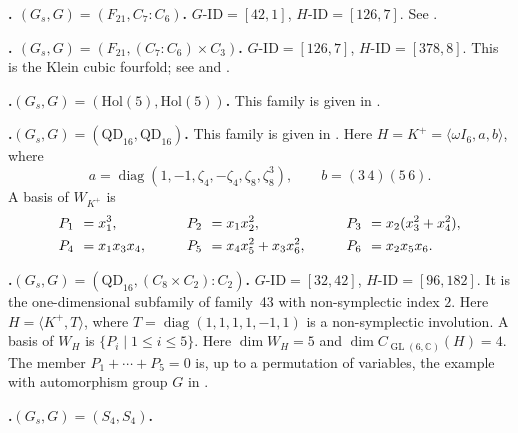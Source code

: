 \documentclass[12pt]{amsart}
\numberwithin{equation}{section}
\theoremstyle{plain}
\theoremstyle{definition}
\theoremstyle{remark}
\newcommand{\CC}{\mathbb C}
\DeclareMathOperator{\GL}{GL}
\DeclareMathOperator{\diag}{diag}
\newcommand{\PBasisLabel}[1]{\mathrlap{P_{#1}}\phantom{P_{99}}}
\begin{document}
\par{}\medskip\noindent\textbf{.\enspace
$(G_s,G)=(F_{21},C_7:C_6)$.}\label{fam:fourfold-no-40}
$G\text{-ID}=[42,1]$, $H\text{-ID}=[126,7]$.
See
\cite[Theorem~1.2(2), \S4.1]{he2025cubicfourfoldsorder7automorphism}.

\par{}\medskip\noindent\textbf{.\enspace
$(G_s,G)=(F_{21},(C_7:C_6)\times C_3)$.}\label{fam:fourfold-no-41}
$G\text{-ID}=[126,7]$, $H\text{-ID}=[378,8]$.
This is the Klein cubic fourfold; see
\cite[\S6.1, (9)]{yang2024automorphism} and
\cite[Theorem~1.2(3), \S4.1]{he2025cubicfourfoldsorder7automorphism}.

\par{}\medskip\noindent\textbf{.\enspace $(G_s,G)=(\mathrm{Hol}(5),\mathrm{Hol}(5))$.}\label{fam:fourfold-no-42}
This family is given in \cite[(6.15)]{KOIKE202512}.

\par{}\medskip\noindent\textbf{.\enspace $(G_s,G)=(\mathrm{QD}_{16},\mathrm{QD}_{16})$.}\label{fam:fourfold-no-43}
This family is given in \cite[(6.3)]{KOIKE202512}.
Here $H=K^+=\langle\omega I_6,a,b\rangle$, where
\[
a=\diag(1,-1,\zeta_4,-\zeta_4,\zeta_8,\zeta_8^3),
\qquad b=(3\,4)(5\,6).
\]
A basis of $W_{K^+}$ is
\begin{alignat*}{3}
\PBasisLabel{1}&=x_1^3,\qquad &\PBasisLabel{2}&=x_1x_2^2,\qquad &\PBasisLabel{3}&=x_2(x_3^2+x_4^2),\\
\PBasisLabel{4}&=x_1x_3x_4,\qquad &\PBasisLabel{5}&=x_4x_5^2+x_3x_6^2,\qquad &\PBasisLabel{6}&=x_2x_5x_6.
\end{alignat*}

\par{}\medskip\noindent\textbf{.\enspace $(G_s,G)=(\mathrm{QD}_{16},(C_8\times C_2):C_2)$.}\label{fam:fourfold-no-44}
$G\text{-ID}=[32,42]$, $H\text{-ID}=[96,182]$.
It is the one-dimensional subfamily of family~43 with non-symplectic
index $2$.  Here $H=\langle K^+,T\rangle$, where
$T=\diag(1,1,1,1,-1,1)$ is a non-symplectic involution.  A basis of $W_H$ is
$\{P_i\mid 1\le i\le5\}$.
Here $\dim W_H=5$ and $\dim C_{\GL(6,\CC)}(H)=4$.
The member $P_1+\cdots+P_5=0$ is, up to a permutation of variables,
the example with automorphism group $G$ in
\cite[\S6.1, (12)]{yang2024automorphism}.

\par{}\medskip\noindent\textbf{.\enspace $(G_s,G)=(S_4,S_4)$.}\label{fam:fourfold-no-45}
\end{document}
